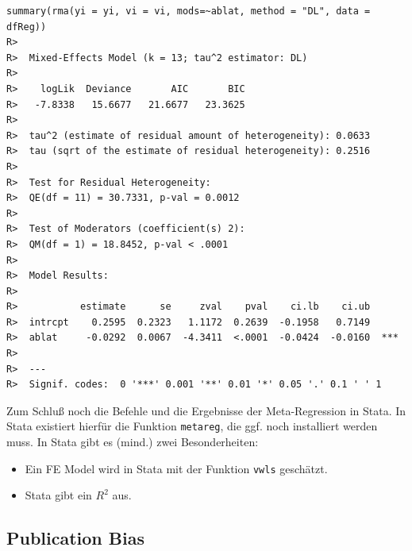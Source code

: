 \documentclass[normalheadings, 10pt]{scrartcl}\usepackage{graphicx, color}
\makeatletter
\newenvironment{kframe}{%
 \def\at@end@of@kframe{}%
 \ifinner\ifhmode%
  \def\at@end@of@kframe{\end{minipage}}%
  \begin{minipage}{\columnwidth}%
 \fi\fi%
 \def\FrameCommand##1{\hskip\@totalleftmargin \hskip-\fboxsep
 \colorbox{shadecolor}{##1}\hskip-\fboxsep
     \hskip-\linewidth \hskip-\@totalleftmargin \hskip\columnwidth}%
 \MakeFramed {\advance\hsize-\width
   \@totalleftmargin\z@ \linewidth\hsize
   \@setminipage}}%
 {\par\unskip\endMakeFramed%
 \at@end@of@kframe}
\newenvironment{knitrout}{}{} %
\newcommand{\code}[1]{\texttt{#1}}
\makeatother
\begin{document}
\begin{rbsp}
\begin{knitrout}
\color{fgcolor}\begin{kframe}
\begin{verbatim}
summary(rma(yi = yi, vi = vi, mods=~ablat, method = "DL", data = dfReg))
R>  
R>  Mixed-Effects Model (k = 13; tau^2 estimator: DL)
R>  
R>    logLik  Deviance       AIC       BIC  
R>   -7.8338   15.6677   21.6677   23.3625  
R>  
R>  tau^2 (estimate of residual amount of heterogeneity): 0.0633
R>  tau (sqrt of the estimate of residual heterogeneity): 0.2516
R>  
R>  Test for Residual Heterogeneity: 
R>  QE(df = 11) = 30.7331, p-val = 0.0012
R>  
R>  Test of Moderators (coefficient(s) 2): 
R>  QM(df = 1) = 18.8452, p-val < .0001
R>  
R>  Model Results:
R>  
R>           estimate      se     zval    pval    ci.lb    ci.ub     
R>  intrcpt    0.2595  0.2323   1.1172  0.2639  -0.1958   0.7149     
R>  ablat     -0.0292  0.0067  -4.3411  <.0001  -0.0424  -0.0160  ***
R>  
R>  ---
R>  Signif. codes:  0 '***' 0.001 '**' 0.01 '*' 0.05 '.' 0.1 ' ' 1
\end{verbatim}
\end{kframe}
\end{knitrout}

\end{rbsp}

Zum Schluß noch die Befehle und die Ergebnisse der Meta-Regression in Stata. In
Stata existiert hierfür die Funktion \code{metareg}, die ggf. noch installiert
werden muss. In Stata gibt es (mind.) zwei Besonderheiten:
\begin{itemize}
\item Ein FE Model wird in Stata mit der Funktion \code{vwls} geschätzt.
\item Stata gibt ein $R^2$ aus.
\end{itemize}


\begin{statabsp}
  
\end{statabsp}


\begin{statabsp}
\begin{tiny}
  
\end{tiny}
\end{statabsp}





\subsection{Publication Bias}
\end{document}
